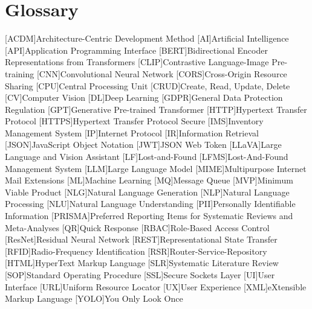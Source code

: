 \chapter{Glossary}

\footnotesize
\DoubleSpacing

\begin{multicols}{2}
\begin{acronym}[]
	[ACDM]{Architecture-Centric Development Method}
	[AI]{Artificial Intelligence}
	[API]{Application Programming Interface}
	[BERT]{Bidirectional Encoder Representations from Transformers}
	[CLIP]{Contrastive Language-Image Pre-training}
	[CNN]{Convolutional Neural Network}
	[CORS]{Cross-Origin Resource Sharing}
	[CPU]{Central Processing Unit}
	[CRUD]{Create, Read, Update, Delete}
	[CV]{Computer Vision}
	[DL]{Deep Learning}
	[GDPR]{General Data Protection Regulation}
	[GPT]{Generative Pre-trained Transformer}
	[HTTP]{Hypertext Transfer Protocol}
	[HTTPS]{Hypertext Transfer Protocol Secure}
	[IMS]{Inventory Management System}
	[IP]{Internet Protocol}
	[IR]{Information Retrieval}
	[JSON]{JavaScript Object Notation}
	[JWT]{JSON Web Token}
	[LLaVA]{Large Language and Vision Assistant}
	[LF]{Lost-and-Found}
	[LFMS]{Lost-And-Found Management System}
	[LLM]{Large Language Model}
	[MIME]{Multipurpose Internet Mail Extensions}
	[ML]{Machine Learning}
	[MQ]{Message Queue}
	[MVP]{Minimum Viable Product}
	[NLG]{Natural Language Generation}
	[NLP]{Natural Language Processing}
	[NLU]{Natural Language Understanding}
	[PII]{Personally Identifiable Information}
	[PRISMA]{Preferred Reporting Items for Systematic Reviews and Meta-Analyses}
	[QR]{Quick Response}
	[RBAC]{Role-Based Access Control}
	[ResNet]{Residual Neural Network}
	[REST]{Representational State Transfer}
	[RFID]{Radio-Frequency Identification}
	[RSR]{Router-Service-Repository}
	[HTML]{HyperText Markup Language}
	[SLR]{Systematic Literature Review}
	[SOP]{Standard Operating Procedure}
	[SSL]{Secure Sockets Layer}
	[UI]{User Interface}
	[URL]{Uniform Resource Locator}
	[UX]{User Experience}
	[XML]{eXtensible Markup Language}
	[YOLO]{You Only Look Once}
\end{acronym}
\end{multicols}

